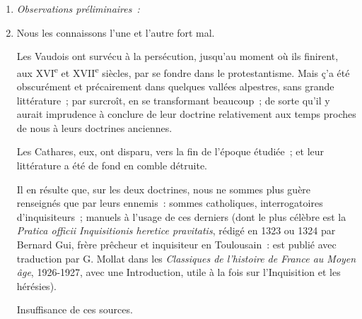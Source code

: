 \documentclass[french,twoside]{book} %
\newlength{\listmod}
\newcommand{\listhead}[1]{\hspace{-1\listmod}\emph{#1}}
\begin{document}
\begin{enumerate}[itemsep=\baselineskip,]
\item[]\listhead{Observations préliminaires :}
\item  Nous les connaissons l’une et l’autre fort mal.\par
 Les Vaudois ont survécu à la persécution, jusqu’au moment où ils finirent, aux XVI\textsuperscript{e} et XVII\textsuperscript{e} siècles, par se fondre dans le protestantisme. Mais ç’a été obscurément et précairement dans quelques vallées alpestres, sans grande littérature ; par surcroît, en se transformant beaucoup ; de sorte qu’il y aurait imprudence à conclure de leur doctrine relativement aux temps proches de nous à leurs doctrines anciennes.\par
 Les Cathares, eux, ont disparu, vers la fin de l’époque étudiée ; et leur littérature a été de fond en comble détruite.\par
 Il en résulte que, sur les deux doctrines, nous ne sommes plus guère renseignés que par leurs ennemis : sommes catholiques, interrogatoires d’inquisiteurs ; manuels à l’usage de ces derniers (dont le plus célèbre est la {\itshape Pratica officii Inquisitionis heretice pravitatis}, rédigé en 1323 ou 1324 par Bernard Gui, frère prêcheur et inquisiteur en Toulousain : est publié avec traduction par G. Mollat dans les {\itshape Classiques de l’histoire de France au Moyen âge}, 1926-1927, avec une Introduction, utile à la fois sur l’Inquisition et les hérésies).\par
 Insuffisance de ces sources.
 

\end{enumerate}
\end{document}
